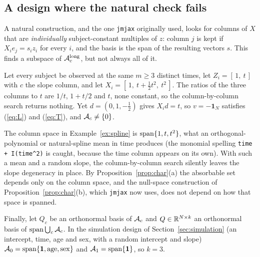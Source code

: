 \subsection{A design where the natural check fails}

A natural construction, and the one \texttt{jmjax} originally used, looks
for columns of $X$ that are \emph{individually} subject-constant multiples
of $z$: column $j$ is kept if $X_i e_j = s_i z_i$ for every $i$, and the
basis is the span of the resulting vectors $s$. This finds a subspace of
$\mathcal{A}_c^{\mathrm{long}}$, but not always all of it.

\begin{example}\label{ex:spline}
Let every subject be observed at the same $m \geq 3$ distinct times, let
$Z_i = [\,1,\ t\,]$ with $c$ the slope column, and let $X_i = [\,1,\ t +
\tfrac12 t^2,\ t^2\,]$. The ratios of the three columns to $t$ are $1/t$,
$1 + t/2$ and $t$, none constant, so the column-by-column search returns
nothing. Yet $d = (0, 1, -\tfrac12)$ gives $X_i d = t$, so $v =
-\mathbf{1}_N$ satisfies (\ref{eq:L}) and (\ref{eq:T}), and $\mathcal{A}_c
\neq \{0\}$.
\end{example}

The column space in Example~\ref{ex:spline} is $\operatorname{span}\{1, t, t^2\}$,
what an orthogonal-polynomial or natural-spline mean in time produces (the
monomial spelling \texttt{time + I(time\^{}2)} is caught, because the
time column appears on its own). With such a mean and a random slope, the
column-by-column search silently leaves the slope degeneracy in place. By
Proposition~\ref{prop:char}(a) the absorbable set depends only on the
column space, and the null-space construction of
Proposition~\ref{prop:char}(b), which \texttt{jmjax} now uses, does not
depend on how that space is spanned.

Finally, let $Q_c$ be an orthonormal basis of $\mathcal{A}_c$ and $Q \in \mathbb{R}^{N
\times k}$ an orthonormal basis of $\operatorname{span}\bigcup_c \mathcal{A}_c$. In the simulation
design of Section~\ref{sec:simulation} (an intercept, time, age and sex,
with a random intercept and slope) $\mathcal{A}_0 = \operatorname{span}\{\mathbf{1}, \mathrm{age},
\mathrm{sex}\}$ and $\mathcal{A}_1 = \operatorname{span}\{\mathbf{1}\}$, so $k = 3$.
